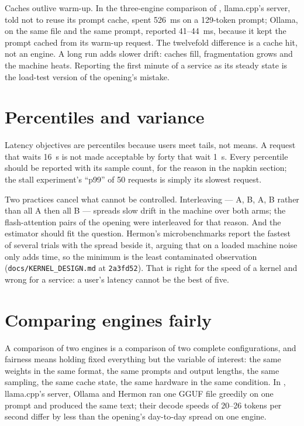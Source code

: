 Caches outlive warm-up. In the three-engine comparison of ,
llama.cpp's server, told not to reuse its prompt cache, spent 526~ms on a
129-token prompt; Ollama, on the same file and the same prompt, reported 41--44~ms,
because it kept the prompt cached from its warm-up request. The twelvefold
difference is a cache hit, not an engine. A long run adds slower drift: caches
fill, fragmentation grows and the machine heats. Reporting the first minute of a
service as its steady state is the load-test version of the opening's mistake.

\section{Percentiles and variance}

Latency objectives are percentiles because users meet tails, not means. A
request that waits 16~s is not made acceptable by forty that wait 1~s. Every
percentile should be reported with its sample count, for the reason in the
napkin section; the stall experiment's ``p99'' of 50 requests is simply its
slowest request.

Two practices cancel what cannot be controlled. Interleaving --- A, B, A, B
rather than all A then all B --- spreads slow drift in the machine over both
arms; the flash-attention pairs of the opening were interleaved for that reason.
And the estimator should fit the question. Hermon's microbenchmarks report the
fastest of several trials with the spread beside it, arguing that on a loaded
machine noise only adds time, so the minimum is the least contaminated
observation (\texttt{docs/KERNEL\_DESIGN.md} at \texttt{2a3fd52}). That is right
for the speed of a kernel and wrong for a service: a user's latency cannot be
the best of five.

\section{Comparing engines fairly}

A comparison of two engines is a comparison of two complete configurations,
and fairness means holding fixed everything but the variable of interest: the
same weights in the same format, the same prompts and output lengths, the same
sampling, the same cache state, the same hardware in the same condition. In
, llama.cpp's server, Ollama and Hermon ran one GGUF file
greedily on one prompt and produced the same text; their decode speeds of
20--26 tokens per second differ by less than the opening's day-to-day spread on
one engine.

